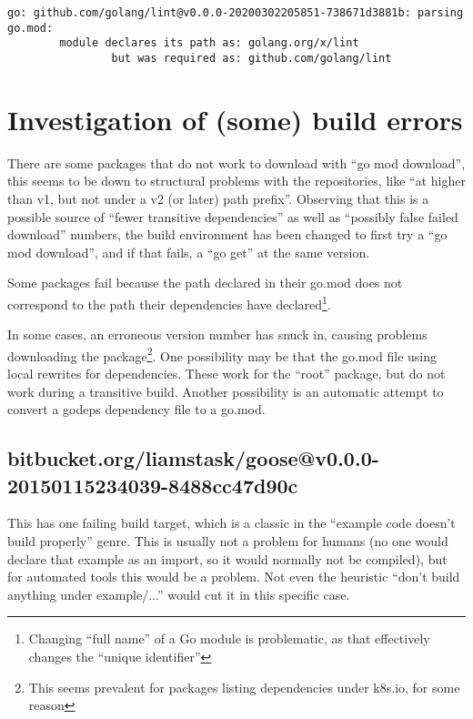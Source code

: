 \documentclass[a4paper]{paper}
\begin{document}
\begin{verbatim}
go: github.com/golang/lint@v0.0.0-20200302205851-738671d3881b: parsing go.mod:
        module declares its path as: golang.org/x/lint
                but was required as: github.com/golang/lint
\end{verbatim}

\section{Investigation of (some) build errors}

There are some packages that do not work to download with ``go mod
download'', this seems to be down to structural problems with the
repositories, like ``at higher than v1, but not under a v2 (or later)
path prefix''. Observing that this is a possible source of ``fewer
transitive dependencies'' as well as ``possibly false failed
download'' numbers, the build environment has been changed to first
try a ``go mod download'', and if that fails, a ``go get'' at the same
version.

Some packages fail because the path declared in their go.mod does not
correspond to the path their dependencies have
declared\footnote{Changing ``full name'' of a Go module is
  problematic, as that effectively changes the ``unique identifier''}.

In some cases, an erroneous version number has snuck in, causing
problems downloading the package\footnote{This seems prevalent for
  packages listing dependencies under k8s.io, for some reason}. One
possibility may be that the go.mod file using local rewrites for
dependencies. These work for the ``root'' package, but do not work
during a transitive build. Another possibility is an automatic attempt
to convert a godeps dependency file to a go.mod.

\subsection{bitbucket.org/liamstask/goose@v0.0.0-20150115234039-8488cc47d90c}

This has one failing build target, which is a classic in the ``example
code doesn't build properly'' genre. This is usually not a problem for
humans (no one would declare that example as an import, so it would
normally not be compiled), but for automated tools this would be a
problem. Not even the heuristic ``don't build anything under
example/...'' would cut it in this specific case.
\end{document}
